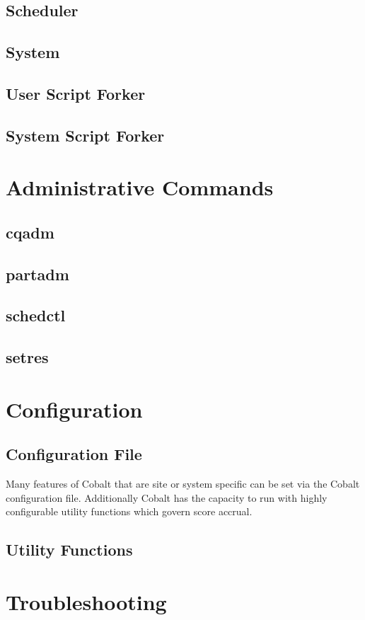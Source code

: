 \documentclass[10pt,letterpaper]{book}
\begin{document}
\section{Scheduler}
\section{System}
\section{User Script Forker}
\section{System Script Forker}

\chapter{Administrative Commands}
\section{cqadm}
\section{partadm}
\section{schedctl}
\section{setres}

\chapter{Configuration}
\section{Configuration File}
Many features of Cobalt that are site or system specific can be set via the Cobalt configuration file.  Additionally Cobalt has the capacity to run with highly configurable utility functions which govern score accrual.
\section{Utility Functions}

  
\chapter{Troubleshooting}
\end{document}
